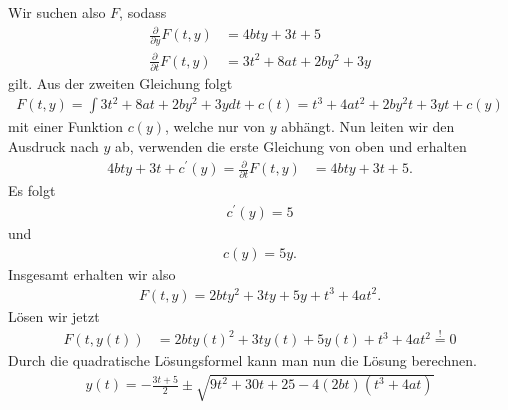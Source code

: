 \begin{solution}
\begin{enumerate}[label = \textbf{\alph*)}]
Wir suchen also $F$, sodass
\begin{align*}
  \frac{\partial}{\partial y}F(t,y) &= 4bty + 3t + 5 \\
  \frac{\partial}{\partial t}F(t,y) &= 3t^2 + 8at + 2by^2 + 3y
\end{align*}
gilt. Aus der zweiten Gleichung folgt
\begin{align*}
  F(t,y) = \int 3t^2 + 8at + 2by^2 + 3y dt + c(t) = t^3 +4at^2 + 2by^2 t +3yt + c(y)
\end{align*}
mit einer Funktion $c(y)$, welche nur von $y$ abhängt.
Nun leiten wir den Ausdruck nach $y$ ab, verwenden die erste Gleichung von oben
und erhalten
\begin{align*}
  4bty + 3t + c^{\prime}(y) = \frac{\partial}{\partial t}F(t,y) &= 4bty + 3t + 5.
\end{align*}
Es folgt
\begin{align*}
  c^{\prime}(y) =  5
\end{align*}
und
\begin{align*}
  c(y) = 5y.
\end{align*}
Insgesamt erhalten wir also
\begin{align*}
  F(t,y) = 2bty^2 + 3ty + 5y + t^3 + 4at^2.
\end{align*}
Lösen wir jetzt
\begin{align*}
  F(t,y(t)) &= 2bty(t)^2 + 3ty(t) + 5y(t) + t^3 + 4at^2 \stackrel{!}{=} 0
\end{align*}
Durch die quadratische Lösungsformel kann man nun die Lösung berechnen.
\begin{align*}
  y(t) = - \frac{3t +5}{2} \pm \sqrt{9t^2 + 30t + 25 - 4(2bt)(t^3 + 4at)}
\end{align*}
\end{enumerate}
\end{solution}
